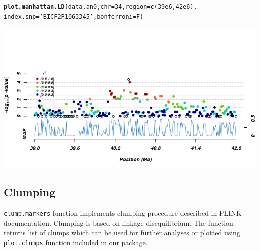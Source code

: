 \documentclass[12pt,a4paper,oneside]{article}\usepackage[]{graphicx}\usepackage[]{color}
\makeatletter
\newcommand{\hlnum}[1]{\textcolor[rgb]{0.686,0.059,0.569}{#1}}%
\newcommand{\hlstr}[1]{\textcolor[rgb]{0.192,0.494,0.8}{#1}}%
\newcommand{\hlstd}[1]{\textcolor[rgb]{0.345,0.345,0.345}{#1}}%
\newcommand{\hlkwc}[1]{\textcolor[rgb]{0.333,0.667,0.333}{#1}}%
\newcommand{\hlkwd}[1]{\textcolor[rgb]{0.737,0.353,0.396}{\textbf{#1}}}%
\newenvironment{kframe}{%
 \def\at@end@of@kframe{}%
 \ifinner\ifhmode%
  \def\at@end@of@kframe{\end{minipage}}%
  \begin{minipage}{\columnwidth}%
 \fi\fi%
 \def\FrameCommand##1{\hskip\@totalleftmargin \hskip-\fboxsep
 \colorbox{shadecolor}{##1}\hskip-\fboxsep
     \hskip-\linewidth \hskip-\@totalleftmargin \hskip\columnwidth}%
 \MakeFramed {\advance\hsize-\width
   \@totalleftmargin\z@ \linewidth\hsize
   \@setminipage}}%
 {\par\unskip\endMakeFramed%
 \at@end@of@kframe}
\newenvironment{knitrout}{}{} %
\makeatother
\begin{document}
\begin{knitrout}\footnotesize
{}\color{fgcolor}\begin{kframe}
\begin{alltt}
\hlkwd{plot.manhattan.LD}\hlstd{(data, an0,} \hlkwc{chr}\hlstd{=}\hlnum{34}\hlstd{,} \hlkwc{region}\hlstd{=}\hlkwd{c}\hlstd{(}\hlnum{39e6}\hlstd{,}\hlnum{42e6}\hlstd{),}
                  \hlkwc{index.snp} \hlstd{=} \hlstr{'BICF2P1063345'}\hlstd{,} \hlkwc{bonferroni} \hlstd{= F)}
\end{alltt}
\end{kframe}

{\centering \includegraphics[width=1.0\textwidth]{images/plot_Manhattan_LD} 

}



\end{knitrout}

\subsection*{Clumping}
\noindent \texttt{clump.markers} function implements clumping procedure described in PLINK documentation. Clumping is based on linkage disequilibrium. The function returns list of clumps which can be used for further analyses or plotted using \texttt{plot.clumps} function included in our package.
\end{document}
